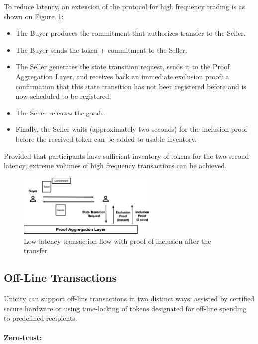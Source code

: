 \documentclass{article}
\begin{document}
To reduce latency, an extension of the protocol for high frequency trading is as shown on Figure~\ref{fig:LowLatency2}:
\begin{itemize}
  \item The Buyer produces the commitment that authorizes transfer to the Seller.
  \item The Buyer sends the token + commitment to the Seller.
  \item The Seller generates the state transition request, sends it to the Proof Aggregation Layer, and receives back an immediate exclusion proof: a confirmation that this state transition has not been registered before and is now scheduled to be registered.
  \item The Seller releases the goods.
  \item Finally, the Seller waits (approximately two seconds) for the inclusion proof before the received token can be added to usable inventory.
\end{itemize}

Provided that participants have sufficient inventory of tokens for the two-second latency, extreme volumes of high frequency transactions can be achieved.

\begin{figure}[ht]
    \centering
    \includegraphics[width=0.6\textwidth]{Transaction2.png}
    \caption{Low-latency transaction flow with proof of inclusion after the transfer}
    \label{fig:LowLatency2}
\end{figure}

\subsection{Off-Line Transactions}

Unicity can support off-line transactions in two distinct ways: assisted by certified secure hardware or using time-locking of tokens designated for off-line spending to predefined recipients.

\paragraph{Zero-trust:}
\end{document}
